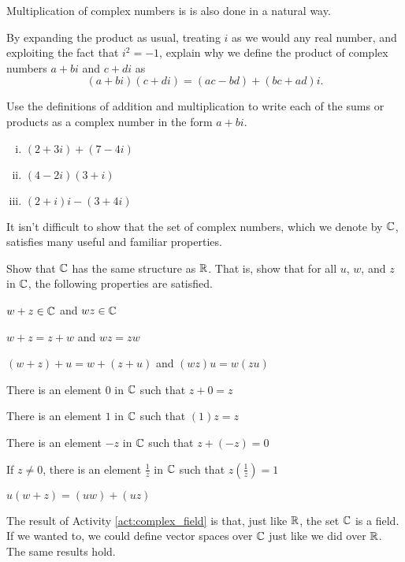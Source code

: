 \begin{activity} Multiplication of complex numbers is is also done in a natural way. 
\ba
\item By expanding the product as usual, treating $i$ as we would any real number, and exploiting the fact that $i^2 = -1$, explain why we define the product of complex numbers $a+bi$ and $c+di$ as 
\[(a+bi)(c+di) = (ac-bd) + (bc+ad)i.\]

\item Use the definitions of addition and multiplication to write each of the sums or products as a complex number in the form $a+bi$.
	\begin{enumerate}[i.]
	\item $(2+3i) + (7-4i)$

	\item $(4-2i)(3+i)$

	\item $(2+i)i - (3+4i)$

	\end{enumerate}
\ea

\end{activity}


It isn't difficult to show that the set of complex numbers, which we denote by $\mathbb{C}$, satisfies many useful and familiar properties. 

\begin{activity} \label{act:complex_field} Show that $\mathbb{C}$ has the same structure as $\mathbb{R}$. That is, show that for all $u$, $w$, and $z$ in $\mathbb{C}$, the following properties are satisfied.
\ba
	\item $w+z \in \mathbb{C}$ and $wz \in \mathbb{C}$ 
	\item $w+z=z+w$ and $wz=zw$ 
	\item $(w+z) + u = w + (z + u)$ and $(wz)u = w(zu)$ 
	\item There is an element $0$ in $\mathbb{C}$ such that $z+ 0 = z$ 
	\item There is an element $1$ in $\mathbb{C}$ such that $(1)z = z$ 
	\item There is an element $-z$ in $\mathbb{C}$ such that $z+(-z) = 0$
	\item If $z \neq 0$, there is an element $\frac{1}{z}$ in $\mathbb{C}$ such that $z\left(\frac{1}{z}\right) = 1$
	\item $u (w + z) = (u w) + (u z)$ 
	\ea

\end{activity}

The result of Activity \ref{act:complex_field} is that, just like $\mathbb{R}$, the set $\mathbb{C}$ is a field. If we wanted to, we could define vector spaces over $\mathbb{C}$ just like we did over $\mathbb{R}$. The same results hold. 

